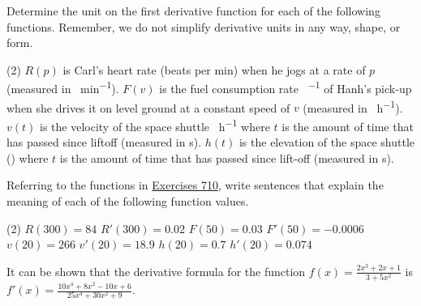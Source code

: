 \documentclass[10pt,oneside,]{book}
\theoremstyle{plain}
\theoremstyle{definition}
\numberwithin{equation}{section}
\newcommand{\fe}[2]{#1\mathopen{}\left(#2\right)\mathclose{}}
\newcommand{\fd}[1]{#1'}
\begin{document}
Determine the unit on the first derivative function for each of the following functions.  Remember, we do not simplify derivative units in any way, shape, or form.%
\par
\begin{exercisegroup}(2)
\exercise[7.]\hypertarget{exercise-derivative-units-supplement-first}{\null}\(\fe{R}{p}\) is Carl's heart rate (beats per min) when he jogs at a rate of \(p\) (measured in \si{\foot\per\minute}).%
\exercise[8.]\hypertarget{exercise-208}{\null}\(\fe{F}{v}\) is the fuel consumption rate \si{\gallon\per\mile} of Hanh's pick-up when she drives it on level ground at a constant speed of \(v\) (measured in \si{\mile\per\hour}).%
\exercise[9.]\hypertarget{exercise-209}{\null}\(\fe{v}{t}\) is the velocity of the space shuttle  \si{\mile\per\hour} where \(t\) is the amount of time that has passed since liftoff (measured in \si{\second}).%
\exercise[10.]\hypertarget{exercise-derivative-units-supplement-last}{\null}\(\fe{h}{t}\) is the elevation of the space shuttle (\si{\mile}) where \(t\) is the amount of time that has passed since lift-off (measured in \si{\second}).%
\end{exercisegroup}
\par\smallskip\noindent
Referring to the functions in \hyperlink{exercise-derivative-units-supplement-first}{Exercises 7}\textendash{}\hyperlink{exercise-derivative-units-supplement-last}{10}, write sentences that explain the meaning of each of the following function values.%
\par
\begin{exercisegroup}(2)
\exercise[11.]\hypertarget{exercise-211}{\null}\(\fe{R}{300}=84\)%
\exercise[12.]\hypertarget{exercise-212}{\null}\(\fe{\fd{R}}{300}=0.02\)%
\exercise[13.]\hypertarget{exercise-213}{\null}\(\fe{F}{50}=0.03\)%
\exercise[14.]\hypertarget{exercise-214}{\null}\(\fe{\fd{F}}{50}=-0.0006\)%
\exercise[15.]\hypertarget{exercise-215}{\null}\(\fe{v}{20}=266\)%
\exercise[16.]\hypertarget{exercise-216}{\null}\(\fe{\fd{v}}{20}=18.9\)%
\exercise[17.]\hypertarget{exercise-217}{\null}\(\fe{h}{20}=0.7\)%
\exercise[18.]\hypertarget{exercise-218}{\null}\(\fe{\fd{h}}{20}=0.074\)%
\end{exercisegroup}
\par\smallskip\noindent
It can be shown that the derivative formula for the function \(\fe{f}{x}=\frac{2x^3+2x+1}{3+5x^2}\) is \(\fe{\fd{f}}{x}=\frac{10x^4+8x^2-10x+6}{25x^4+30x^2+9}\).%
\par
\end{document}
